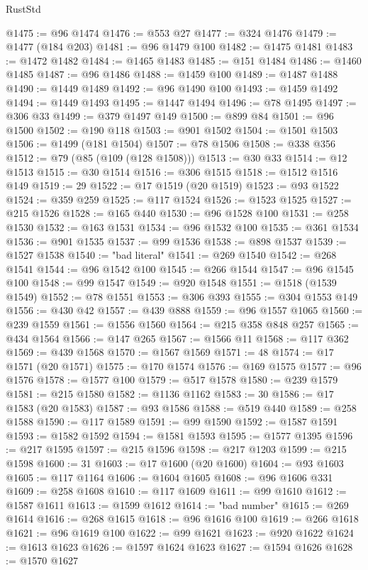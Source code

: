 \begin{lexlean}{RustStd}
\begin{coremodule}
@1475 := @96 @1474
@1476 := @553 @27
@1477 := @324 @1476
@1479 := @1477 (@184 @203)
@1481 := @96 @1479 @100
@1482 := @1475 @1481
@1483 := @1472 @1482
@1484 := @1465 @1483
@1485 := @151 @1484
@1486 := @1460 @1485
@1487 := @96 @1486
@1488 := @1459 @100
@1489 := @1487 @1488
@1490 := @1449 @1489
@1492 := @96 @1490 @100
@1493 := @1459 @1492
@1494 := @1449 @1493
@1495 := @1447 @1494
@1496 := @78 @1495
@1497 := @306 @33
@1499 := @379 @1497 @149
@1500 := @899 @84
@1501 := @96 @1500
@1502 := @190 @118
@1503 := @901 @1502
@1504 := @1501 @1503
@1506 := @1499 (@181 @1504)
@1507 := @78 @1506
@1508 := @338 @356
@1512 := @79 (@85 (@109 (@128 @1508)))
@1513 := @30 @33
@1514 := @12 @1513
@1515 := @30 @1514
@1516 := @306 @1515
@1518 := @1512 @1516 @149
@1519 := 29
@1522 := @17 @1519 (@20 @1519)
@1523 := @93 @1522
@1524 := @359 @259
@1525 := @117 @1524
@1526 := @1523 @1525
@1527 := @215 @1526
@1528 := @165 @440
@1530 := @96 @1528 @100
@1531 := @258 @1530
@1532 := @163 @1531
@1534 := @96 @1532 @100
@1535 := @361 @1534
@1536 := @901 @1535
@1537 := @99 @1536
@1538 := @898 @1537
@1539 := @1527 @1538
@1540 := "bad literal"
@1541 := @269 @1540
@1542 := @268 @1541
@1544 := @96 @1542 @100
@1545 := @266 @1544
@1547 := @96 @1545 @100
@1548 := @99 @1547
@1549 := @920 @1548
@1551 := @1518 (@1539 @1549)
@1552 := @78 @1551
@1553 := @306 @393
@1555 := @304 @1553 @149
@1556 := @430 @42
@1557 := @439 @888
@1559 := @96 @1557 @1065
@1560 := @239 @1559
@1561 := @1556 @1560
@1564 := @215 @358 @848 @257
@1565 := @434 @1564
@1566 := @147 @265
@1567 := @1566 @11
@1568 := @117 @362
@1569 := @439 @1568
@1570 := @1567 @1569
@1571 := 48
@1574 := @17 @1571 (@20 @1571)
@1575 := @170 @1574
@1576 := @169 @1575
@1577 := @96 @1576
@1578 := @1577 @100
@1579 := @517 @1578
@1580 := @239 @1579
@1581 := @215 @1580
@1582 := @1136 @1162
@1583 := 30
@1586 := @17 @1583 (@20 @1583)
@1587 := @93 @1586
@1588 := @519 @440
@1589 := @258 @1588
@1590 := @117 @1589
@1591 := @99 @1590
@1592 := @1587 @1591
@1593 := @1582 @1592
@1594 := @1581 @1593
@1595 := @1577 @1395
@1596 := @217 @1595
@1597 := @215 @1596
@1598 := @217 @1203
@1599 := @215 @1598
@1600 := 31
@1603 := @17 @1600 (@20 @1600)
@1604 := @93 @1603
@1605 := @117 @1164
@1606 := @1604 @1605
@1608 := @96 @1606 @331
@1609 := @258 @1608
@1610 := @117 @1609
@1611 := @99 @1610
@1612 := @1587 @1611
@1613 := @1599 @1612
@1614 := "bad number"
@1615 := @269 @1614
@1616 := @268 @1615
@1618 := @96 @1616 @100
@1619 := @266 @1618
@1621 := @96 @1619 @100
@1622 := @99 @1621
@1623 := @920 @1622
@1624 := @1613 @1623
@1626 := @1597 @1624 @1623
@1627 := @1594 @1626
@1628 := @1570 @1627

\end{coremodule}
\end{lexlean}
